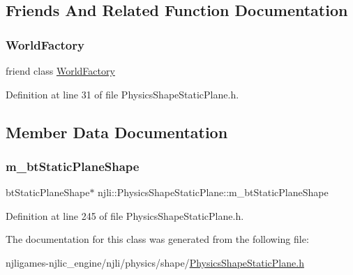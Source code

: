 \subsection{Friends And Related Function Documentation}
\mbox{\label{classnjli_1_1_physics_shape_static_plane_acb96ebb09abe8f2a37a915a842babfac}} 
\subsubsection{\texorpdfstring{World\+Factory}{WorldFactory}}
{\footnotesize\ttfamily friend class \mbox{\hyperlink{classnjli_1_1_world_factory}{World\+Factory}}\hspace{0.3cm}{\ttfamily [friend]}}



Definition at line 31 of file Physics\+Shape\+Static\+Plane.\+h.



\subsection{Member Data Documentation}
\mbox{\label{classnjli_1_1_physics_shape_static_plane_ab6d17e2865a59caf1bd6022df162b258}} 
\subsubsection{\texorpdfstring{m\+\_\+bt\+Static\+Plane\+Shape}{m\_btStaticPlaneShape}}
{\footnotesize\ttfamily bt\+Static\+Plane\+Shape$\ast$ njli\+::\+Physics\+Shape\+Static\+Plane\+::m\+\_\+bt\+Static\+Plane\+Shape\hspace{0.3cm}{\ttfamily [private]}}



Definition at line 245 of file Physics\+Shape\+Static\+Plane.\+h.



The documentation for this class was generated from the following file\+:\begin{DoxyCompactItemize}
\item 
njligames-\/njlic\+\_\+engine/njli/physics/shape/\mbox{\hyperlink{_physics_shape_static_plane_8h}{Physics\+Shape\+Static\+Plane.\+h}}\end{DoxyCompactItemize}
